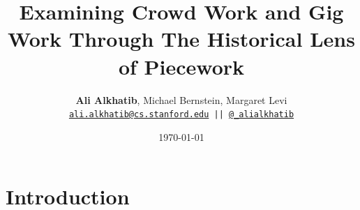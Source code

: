 \documentclass{beamer}
\title{Examining Crowd Work and Gig Work Through The Historical Lens of Piecework}
\author{\textbf{Ali Alkhatib},
                Michael Bernstein,
                Margaret Levi\\
\texttt{ \scriptsize{\href{mailto:ali.alkhatib@cs.stanford.edu}{ali.alkhatib@cs.stanford.edu} ||
         \href{http://twitter.com/_alialkhatib}{@\_alialkhatib}} }}
\institute[Stanford]{Stanford University}
\date{\today}
\begin{document}
\begin{frame}
\titlepage
\end{frame}



\section*{Introduction}



\end{document}
